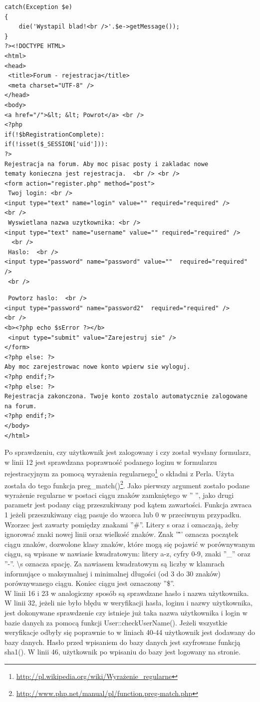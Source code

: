 \documentclass[a4paper,10pt]{article}
\begin{document}
{\begin{verbatim}
catch(Exception $e)
{
	die('Wystapil blad!<br />'.$e->getMessage());
}
?><!DOCTYPE HTML>
<html>
<head>
 <title>Forum - rejestracja</title>
 <meta charset="UTF-8" />
</head>
<body>
<a href="/">&lt; &lt; Powrot</a> <br />
<?php 
if(!$bRegistrationComplete): 
if(!isset($_SESSION['uid'])):
?>
Rejestracja na forum. Aby moc pisac posty i zakladac nowe 
tematy konieczna jest rejestracja.  <br /> <br />
<form action="register.php" method="post">
 Twoj login: <br />
<input type="text" name="login" value="" required="required" />
<br />
 Wyswietlana nazwa uzytkownika: <br />
<input type="text" name="username" value="" required="required" />
  <br />
 Haslo:  <br />
<input type="password" name="password" value=""  required="required" />
 <br />
\end{verbatim}
\begin{verbatim}
 Powtorz haslo:  <br />
<input type="password" name="password2"  required="required" />
<br />
<b><?php echo $sError ?></b>
 <input type="submit" value="Zarejestruj sie" />
</form>
<?php else: ?>
Aby moc zarejestrowac nowe konto wpierw sie wyloguj.
<?php endif;?>
<?php else: ?>
Rejestracja zakonczona. Twoje konto zostalo automatycznie zalogowane na forum.
<?php endif;?>
</body>
</html>
\end{verbatim}
Po sprawdzeniu, czy użytkownik jest zalogowany i czy został wysłany formularz, w linii 12 jest sprawdzana poprawność podanego loginu w formularzu rejestracyjnym za pomocą wyrażenia regularnego\footnote{\href{http://pl.wikipedia.org/wiki/Wyrażenie\_regularne}{http://pl.wikipedia.org/wiki/Wyrażenie\_regularne}} o składni z Perla. Użyta została do tego funkcja preg\_match()\footnote{\href{http://www.php.net/manual/pl/function.preg-match.php}{http://www.php.net/manual/pl/function.preg-match.php}}. Jako pierwszy argument zostało podane wyrażenie regularne w postaci ciągu znaków zamkniętego w '' '', jako drugi parametr jest podany ciąg przeszukiwany pod kątem zawartości. Funkcja zwraca 1 jeżeli przeszukiwany ciąg pasuje do wzorca lub 0 w przeciwnym przypadku. Wzorzec jest zawarty pomiędzy znakami ''\#''. Litery s oraz i oznaczają, żeby ignorować znaki nowej linii oraz wielkość znaków. Znak ''\^'' oznacza początek ciągu znaków, dozwolone klasy znaków, które mogą się pojawić w porównywanym ciągu, są wpisane w nawiasie kwadratowym: litery a-z, cyfry 0-9, znaki ''\_'' oraz ''-''. \textbackslash s oznacza spację. Za nawiasem kwadratowym są liczby w klamrach informujące o maksymalnej i minimalnej długości (od 3 do 30 znaków) porównywanego ciągu. Koniec ciągu jest oznaczony ''\$''.\\
W linii 16 i 23 w analogiczny sposób są sprawdzane hasło i nazwa użytkownika.\\
W linii 32, jeżeli nie było błędu w weryfikacji hasła, loginu i nazwy użytkownika, jest dokonywane sprawdzenie czy istnieje już taka nazwa użytkownika i login w bazie danych za pomocą funkcji User::checkUserName(). Jeżeli wszystkie weryfikacje odbyły się poprawnie to w liniach 40-44 użytkownik jest dodawany do bazy danych. Hasło przed wpisaniem do bazy danych jest szyfrowane funkcją sha1(). W linii 46, użytkownik po  wpisaniu do bazy jest logowany na stronie.

}
\end{document}
